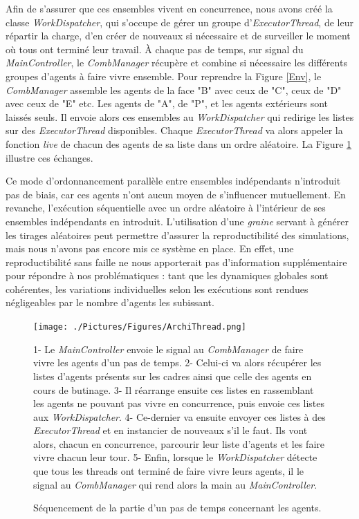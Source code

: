 			Afin de s'assurer que ces ensembles vivent en concurrence, nous avons créé la classe \textit{WorkDispatcher}, qui s'occupe de gérer un groupe d'\textit{ExecutorThread}, de leur répartir la charge, d'en créer de nouveaux si nécessaire et de surveiller le moment où tous ont terminé leur travail. À chaque pas de temps, sur signal du \textit{MainController}, le \textit{CombManager} récupère et combine si nécessaire les différents groupes d'agents à faire vivre ensemble. Pour reprendre la Figure \ref{Env}, le \textit{CombManager} assemble les agents de la face "B" avec ceux de "C", ceux de "D" avec ceux de "E" etc. Les agents de "A", de "P", et les agents extérieurs sont laissés seuls. Il envoie alors ces ensembles au \textit{WorkDispatcher} qui redirige les listes sur des \textit{ExecutorThread} disponibles. Chaque \textit{ExecutorThread} va alors appeler la fonction \textit{live} de chacun des agents de sa liste dans un ordre aléatoire. La Figure \ref{ArchiThread} illustre ces échanges.
			
			Ce mode d'ordonnancement parallèle entre ensembles indépendants n'introduit pas de biais, car ces agents n'ont aucun moyen de s'influencer mutuellement. En revanche, l'exécution séquentielle avec un ordre aléatoire à l'intérieur de ses ensembles indépendants en introduit. L'utilisation d'une \textit{graine} servant à générer les tirages aléatoires peut permettre d'assurer la reproductibilité des simulations, mais nous n'avons pas encore mis ce système en place. En effet, une reproductibilité sans faille ne nous apporterait pas d'information supplémentaire pour répondre à nos problématiques : tant que les dynamiques globales sont cohérentes, les variations individuelles selon les exécutions sont rendues négligeables par le nombre d'agents les subissant.
			
			\begin{figure}
			\centering
			\texttt{[image: ./Pictures/Figures/ArchiThread.png]}
			\caption{Séquencement de la partie d'un pas de temps concernant les agents.}{1- Le \textit{MainController} envoie le signal au \textit{CombManager} de faire vivre les agents d'un pas de temps. 2- Celui-ci va alors récupérer les listes d'agents présents sur les cadres ainsi que celle des agents en cours de butinage. 3- Il réarrange ensuite ces listes en rassemblant les agents ne pouvant pas vivre en concurrence, puis envoie ces listes aux \textit{WorkDispatcher}. 4- Ce-dernier va ensuite envoyer ces listes à des \textit{ExecutorThread} et en instancier de nouveaux s'il le faut. Ils vont alors, chacun en concurrence, parcourir leur liste d'agents et les faire vivre chacun leur tour. 5- Enfin, lorsque le \textit{WorkDispatcher} détecte que tous les threads ont terminé de faire vivre leurs agents, il le signal au \textit{CombManager} qui rend alors la main au \textit{MainController}.}
			\label{ArchiThread}
			\end{figure}
			
